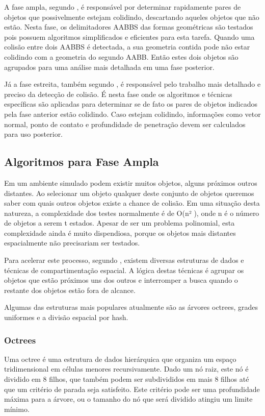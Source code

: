 A fase ampla, segundo , é responsável por determinar rapidamente pares de objetos que possivelmente estejam colidindo, descartando aqueles objetos que não estão.
Nesta fase, os delimitadores AABBS das formas geométricas são testados pois possuem algoritmos simplificados e eficientes para esta tarefa.
Quando uma colisão entre dois AABBS é detectada, a sua geometria contida pode não estar colidindo com a geometria do segundo AABB. Então estes dois objetos são agrupados para uma análise mais detalhada em uma fase posterior.

Já a fase estreita, também segundo ,  é responsável pelo trabalho mais detalhado e preciso da detecção de colisão.
É nesta fase onde os algoritmos e técnicas específicas são aplicadas para determinar se de fato os pares de objetos indicados pela fase anterior estão colidindo.
Caso estejam colidindo, informações como vetor normal, ponto de contato e profundidade de penetração devem ser calculados para uso posterior.

\subsection{Algoritmos para Fase Ampla}
Em um ambiente simulado podem existir muitos objetos, alguns próximos outros distantes. 
Ao selecionar um objeto qualquer deste conjunto de objetos queremos saber com quais outros objetos existe a chance de colisão. 
Em uma situação desta natureza, a complexidade dos testes normalmente é de O(n² ), onde n é o número de objetos a serem t
estados. Apesar de ser um problema polinomial, esta complexidade ainda é muito dispendiosa, porque os objetos mais distantes espacialmente não precisariam ser testados.

Para acelerar este processo, segundo , existem diversas estruturas de dados e técnicas de compartimentação espacial. 
A lógica destas técnicas é agrupar os objetos que estão próximos uns dos outros e interromper a busca quando o restante dos objetos estão fora de alcance.

Algumas das estruturas mais populares atualmente são as árvores octrees, grades uniformes e a divisão espacial por hash.

\subsubsection{Octrees}

Uma octree é uma estrutura de dados hierárquica que organiza um espaço
tridimensional em células menores recursivamente.
Dado um nó raiz, este nó é dividido em 8  filhos, que também podem ser
subdivididos em mais 8 filhos até que um critério de parada seja satisfeito.
Este critério pode ser uma profundidade máxima para a árvore, ou o tamanho do
nó que será dividido atingiu um limite mínimo.

